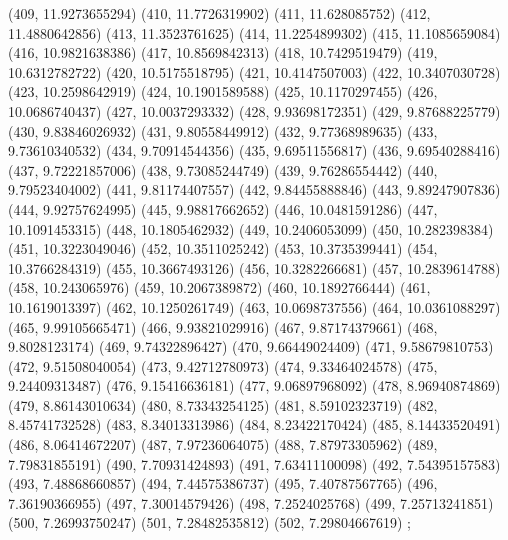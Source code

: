 {					(409, 11.9273655294)
					(410, 11.7726319902)
					(411, 11.628085752)
					(412, 11.4880642856)
					(413, 11.3523761625)
					(414, 11.2254899302)
					(415, 11.1085659084)
					(416, 10.9821638386)
					(417, 10.8569842313)
					(418, 10.7429519479)
					(419, 10.6312782722)
					(420, 10.5175518795)
					(421, 10.4147507003)
					(422, 10.3407030728)
					(423, 10.2598642919)
					(424, 10.1901589588)
					(425, 10.1170297455)
					(426, 10.0686740437)
					(427, 10.0037293332)
					(428, 9.93698172351)
					(429, 9.87688225779)
					(430, 9.83846026932)
					(431, 9.80558449912)
					(432, 9.77368989635)
					(433, 9.73610340532)
					(434, 9.70914544356)
					(435, 9.69511556817)
					(436, 9.69540288416)
					(437, 9.72221857006)
					(438, 9.73085244749)
					(439, 9.76286554442)
					(440, 9.79523404002)
					(441, 9.81174407557)
					(442, 9.84455888846)
					(443, 9.89247907836)
					(444, 9.92757624995)
					(445, 9.98817662652)
					(446, 10.0481591286)
					(447, 10.1091453315)
					(448, 10.1805462932)
					(449, 10.2406053099)
					(450, 10.282398384)
					(451, 10.3223049046)
					(452, 10.3511025242)
					(453, 10.3735399441)
					(454, 10.3766284319)
					(455, 10.3667493126)
					(456, 10.3282266681)
					(457, 10.2839614788)
					(458, 10.243065976)
					(459, 10.2067389872)
					(460, 10.1892766444)
					(461, 10.1619013397)
					(462, 10.1250261749)
					(463, 10.0698737556)
					(464, 10.0361088297)
					(465, 9.99105665471)
					(466, 9.93821029916)
					(467, 9.87174379661)
					(468, 9.8028123174)
					(469, 9.74322896427)
					(470, 9.66449024409)
					(471, 9.58679810753)
					(472, 9.51508040054)
					(473, 9.42712780973)
					(474, 9.33464024578)
					(475, 9.24409313487)
					(476, 9.15416636181)
					(477, 9.06897968092)
					(478, 8.96940874869)
					(479, 8.86143010634)
					(480, 8.73343254125)
					(481, 8.59102323719)
					(482, 8.45741732528)
					(483, 8.34013313986)
					(484, 8.23422170424)
					(485, 8.14433520491)
					(486, 8.06414672207)
					(487, 7.97236064075)
					(488, 7.87973305962)
					(489, 7.79831855191)
					(490, 7.70931424893)
					(491, 7.63411100098)
					(492, 7.54395157583)
					(493, 7.48868660857)
					(494, 7.44575386737)
					(495, 7.40787567765)
					(496, 7.36190366955)
					(497, 7.30014579426)
					(498, 7.2524025768)
					(499, 7.25713241851)
					(500, 7.26993750247)
					(501, 7.28482535812)
					(502, 7.29804667619)
				};

